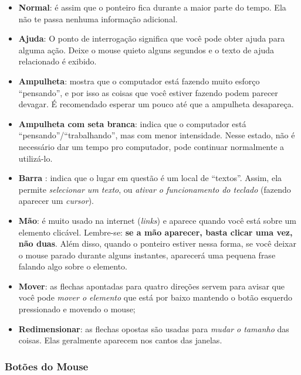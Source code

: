 \documentclass[hidelinks,12pt]{article}
\begin{document}
\begin{itemize}
	\item \textbf{Normal}: é assim que o ponteiro fica durante a maior parte do tempo. Ela não te passa nenhuma informação adicional.
	
	\item \textbf{Ajuda}: O ponto de interrogação significa que você pode obter ajuda para alguma ação. Deixe o mouse quieto alguns segundos e o texto de ajuda relacionado é exibido.
	
	\item \textbf{Ampulheta}: mostra que o computador está fazendo muito esforço ``pensando'', e por isso as coisas que você estiver fazendo podem parecer devagar. É recomendado esperar um pouco até que a ampulheta desapareça.
	
	\item \textbf{Ampulheta com seta branca}: indica que o computador está ``pensando''/``trabalhando'', mas com menor intensidade. Nesse estado, não é necessário dar um tempo pro computador, pode continuar normalmente a utilizá-lo.
	
	\item \textbf{Barra} : indica que o lugar em questão é um local de ``textos''. Assim, ela permite \emph{selecionar um texto}, ou \emph{ativar o funcionamento do teclado} (fazendo aparecer um \emph{cursor}).
	
	\item \textbf{Mão}: é muito usado na internet (\emph{links}) e aparece quando você está sobre um elemento clicável. Lembre-se: \textbf{se a mão aparecer, basta clicar uma vez, não duas}. Além disso, quando o ponteiro estiver nessa forma, se você deixar o mouse parado durante alguns instantes, aparecerá uma pequena frase falando algo sobre o elemento.
	
	\item \textbf{Mover}: as flechas apontadas para quatro direções servem para avisar que você pode \emph{mover o elemento} que está por baixo mantendo o botão esquerdo pressionado e movendo o mouse;
	
	\item \textbf{Redimensionar}: as flechas opostas são usadas para \emph{mudar o tamanho} das coisas. Elas geralmente aparecem nos cantos das janelas.

\end{itemize}

\subsubsection{Botões do Mouse}
\label{botoes-mouse}
\end{document}
